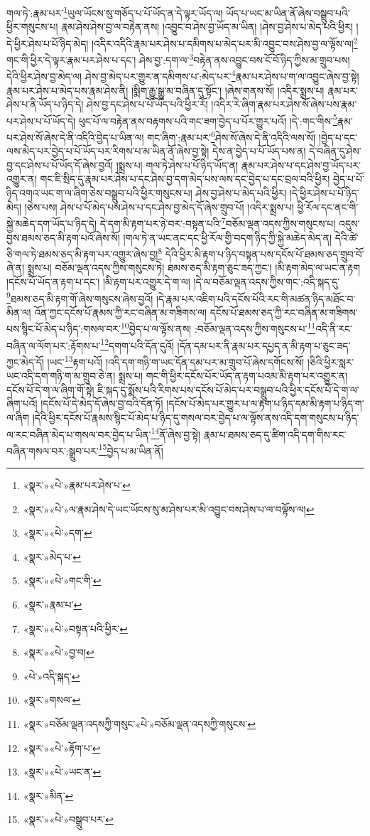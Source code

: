 གལ་ཏེ་:རྣམ་པར་\footnote{«སྣར་»«པེ་»རྣམ་པར་ཤེས་པ་}ཡུལ་ཡོངས་སུ་གཅོད་པ་པོ་ཡོད་ན་དེ་ལྟར་ཡོད་ལ། ཡོད་པ་ཡང་མ་ཡིན་ནོ་ཞེས་བསྒྲུབ་པའི་ཕྱིར་གསུངས་པ། རྣམ་ཤེས་ཤེས་བྱ་ལ་བརྟེན་ནས། །འབྱུང་བ་ཤེས་བྱ་ཡོད་མ་ཡིན། །ཤེས་བྱ་ཤེས་པ་མེད་པའི་ཕྱིར། །དེ་ཕྱིར་ཤེས་པ་པོ་ཉིད་མེད། །འདིར་འདིའི་རྣམ་པར་ཤེས་པ་དམིགས་པ་མེད་པར་མི་འབྱུང་བས་ཤེས་བྱ་ལ་ལྟོས་ལ།\footnote{«སྣར་»«པེ་»ལ་རྣམ་ཤེས་དེ་ཡང་ཡོངས་སུ་མ་ཤེས་པར་མི་འབྱུང་བས་ཤེས་པ་ལ་བལྟོས་ལ།} གང་གི་ཕྱིར་དེ་ལྟར་རྣམ་པར་ཤེས་པ་དང་། ཤེས་བྱ་:དག་ལ་\footnote{«སྣར་»«པེ་»དག་}བརྟེན་ནས་འབྱུང་བས་ངོ་བོ་ཉིད་ཀྱིས་མ་གྲུབ་པས། དེའི་ཕྱིར་ཤེས་བྱ་མེད་ལ། ཤེས་བྱ་མེད་པར་གྱུར་ན་དམིགས་པ་:མེད་པར་\footnote{«སྣར་»མེད་པ་}རྣམ་པར་ཤེས་པ་ག་ལ་འབྱུང་ཞེས་བྱ་སྟེ། རྣམ་པར་ཤེས་པ་མེད་པས་རྣམ་ཤེས་ནི། །སྨིག་རྒྱུ་སྒྱུ་མ་བཞིན་དུ་སྟོང་། །ཞེས་གནས་སོ། །འདིར་སྨྲས་པ། རྣམ་པར་ཤེས་པ་ནི་ཡོད་པ་ཉིད་དེ། ཤེས་བྱ་དང་ཤེས་པ་པོ་ཡོད་པའི་ཕྱིར་རོ། །འདིར་རེ་ཞིག་རྣམ་པར་ཤེས་སོ་ཞེས་པས་རྣམ་པར་ཤེས་པ་པོ་ཡོད་དེ། ཕུང་པོ་ལ་བརྟེན་ནས་བརྟགས་པའི་གང་ཟག་བྱེད་པ་པོར་གྱུར་པའོ། །དེ་:གང་གིས་\footnote{«སྣར་»«པེ་»གང་གི་}རྣམ་པར་ཤེས་སོ་ཞེས་དེ་ནི་འདིའི་བྱེད་པ་ཡིན་ལ། གང་ཞིག་:རྣམ་པར་\footnote{«སྣར་»རྣམ་པ་}ཤེས་སོ་ཞེས་དེ་ནི་འདིའི་ལས་སོ། །བྱེད་པ་དང་ལས་མེད་པར་བྱེད་པ་པོ་ཡོད་པར་རིགས་པ་མ་ཡིན་ནོ་ཞེས་བྱ་སྟེ། དེས་ན་བྱེད་པ་པོ་ཡོད་པས་ན། དེ་བཞིན་དུ་ཤེས་བྱ་དང་ཤེས་པ་པོ་ཡོད་དོ་ཞེས་བྱའོ། །སྨྲས་པ། གལ་ཏེ་ཤེས་པ་པོ་ཉིད་ཡོད་ན། རྣམ་པར་ཤེས་པ་དང་ཤེས་བྱ་ཡོད་པར་འགྱུར་ན། གང་ཇི་སྲིད་དུ་རྣམ་པར་ཤེས་པ་དང་ཤེས་བྱ་དག་མེད་པས་ལས་དང་བྱེད་པ་དང་བྲལ་བའི་ཕྱིར། བྱེད་པ་པོ་ཉིད་འགའ་ཡང་ག་ལ་ཞིག་ཅེས་བསྒྲུབ་པའི་ཕྱིར་གསུངས་པ། ཤེས་བྱ་ཤེས་པ་མེད་པའི་ཕྱིར། །དེ་ཕྱིར་ཤེས་པ་པོ་ཉིད་མེད། །ཅེས་པས། ཤེས་པ་པོ་མེད་པས་ཤེས་པ་དང་ཤེས་བྱ་མེད་དོ་ཞེས་གྲུབ་པོ། །འདིར་སྨྲས་པ། ཕྱི་རོལ་དང་ནང་གི་སྐྱེ་མཆེད་དག་ཡོད་པ་ཉིད་དེ། དེ་དག་མི་རྟག་པར་ཉེ་བར་:བསྟན་པའི་\footnote{«སྣར་»«པེ་»བསྟན་པའི་ཕྱིར་}བཅོམ་ལྡན་འདས་ཀྱིས་གསུངས་པ། འདུས་བྱས་ཐམས་ཅད་མི་རྟག་པའོ་ཞེས་སོ། །གལ་ཏེ་ན་ཡང་ནང་དང་ཕྱི་རོལ་གྱི་བདག་ཉིད་ཀྱི་སྐྱེ་མཆེད་མེད་ན། དེའི་ཚེ་ཅི་གལ་ཏེ་ཐམས་ཅད་མི་རྟག་པར་འགྱུར་ཞེས་བྱ།\footnote{«སྣར་»«པེ་»བྱ་བ།} དེའི་ཕྱིར་མི་རྟག་པ་ཉིད་བསྟན་པས་དངོས་པོ་ཐམས་ཅད་གྲུབ་བོ་ཞེ་ན། སྨྲས་པ། བཅོམ་ལྡན་འདས་ཀྱིས་གསུངས་ཏེ། ཐམས་ཅད་མི་རྟག་ཅུང་ཟད་ཀྱང་། །མི་རྟག་མེད་ལ་ཡང་ན་རྟག །དངོས་པོ་ཡོད་ན་རྟག་པ་དང་། །མི་རྟག་པར་འགྱུར་དེ་ག་ལ། །དེ་ལ་བཅོམ་ལྡན་འདས་ཀྱིས་གང་:འདི་སྐད་དུ་\footnote{«པེ་»འདི་སྐད་}ཐམས་ཅད་མི་རྟག་གོ་ཞེས་གསུངས་ཞེས་བྱའོ། །དེ་རྣམ་པར་འཇིག་པའི་དངོས་པོའི་རང་གི་མཚན་ཉིད་མཐོང་བ་མིན་ལ། འོན་ཀྱང་དངོས་པོ་རྣམས་ཀྱི་རང་བཞིན་མ་གཟིགས་ལ། དངོས་པོ་ཐམས་ཅད་ཀྱི་རང་བཞིན་མ་གཟིགས་པས་སྙིང་པོ་མེད་པ་ཉིད་:གསལ་བར་\footnote{«སྣར་»གསལ་}བྱེད་པ་ལ་ལྟོས་ནས། :བཅོམ་ལྡན་འདས་ཀྱིས་གསུངས་པ་\footnote{«སྣར་»བཅོམ་ལྡན་འདསཀྱི་གསུང་«པེ་»བཅོམ་ལྡན་འདསཀྱི་གསུངས་}འདི་ནི་རང་བཞིན་ལ་ལོག་པར་:རྟོགས་པ་\footnote{«སྣར་»«པེ་»རྟོག་པ་}དགག་པའི་དོན་དུའོ། །དོན་དམ་པར་ནི་རྣམ་པར་དཔྱད་ན་མི་རྟག་པ་ཅུང་ཟད་ཀྱང་མེད་དོ། །ཡང་\footnote{«སྣར་»«པེ་»ཡང་ན་}རྟག་པའོ། །འདི་དག་གཉི་ག་ཡང་དོན་དམ་པར་མ་གྲུབ་པོ་ཞེས་དགོངས་སོ། །ཅིའི་ཕྱིར་སླར་ཡང་འདི་དག་གཉི་ག་མ་གྲུབ་ཅེ་ན། སྨྲས་པ། གང་གི་ཕྱིར་དངོས་པོར་ཡོད་ན་རྟག་པའམ་མི་རྟག་པར་འགྱུར་ན། དངོས་པོ་དེ་ག་ལ་ཞིག་གོ་སྟེ། ཇི་སྐད་དུ་སྨོས་པའི་རིགས་པས་དངོས་པོ་མེད་པར་བསྒྲུབ་པའི་ཕྱིར་དངོས་པོ་དེ་ག་ལ་ཞིག་པའོ། །དངོས་པོ་དེ་མེད་དོ་ཞེས་བྱ་བའི་དོན་ཏོ། །དངོས་པོ་མེད་པར་གྱུར་པ་ལ་རྟག་པ་ཉིད་དམ་མི་རྟག་པ་ཉིད་ག་ལ་ཞིག །དེའི་ཕྱིར་དངོས་པོ་རྣམས་སྙིང་པོ་མེད་པ་ཉིད་དུ་གསལ་བར་བྱེད་པ་ལ་ལྟོས་ནས་འདི་དག་གསུངས་པ་ཉིད་ལ་རང་བཞིན་མེད་པ་གསལ་བར་བྱེད་པ་ཡིན་\footnote{«སྣར་»མིན་}ནོ་ཞེས་བྱ་སྟེ། རྣམ་པ་ཐམས་ཅད་དུ་ཚིག་འདི་དག་གིས་རང་བཞིན་གསལ་བར་:སྒྲུབ་པར་\footnote{«སྣར་»«པེ་»བསྒྲུབ་པར་}བྱེད་པ་མ་ཡིན་ནོ། 